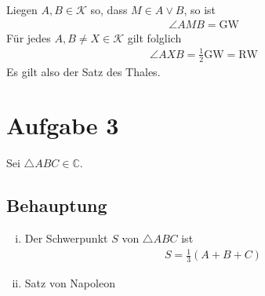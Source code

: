 \documentclass[11pt]{article}
\begin{document}
	\noindent Liegen $ A,B \in \mathcal{K} $ so, dass $ M \in A \lor B $, so ist
	\begin{align*}
	\angle AMB = \mathrm{GW}
	\end{align*}
	Für jedes $ A,B \neq X \in \mathcal{K} $ gilt folglich
	\begin{align*}
	\angle AXB = \frac{1}{2} \mathrm{GW} = \mathrm{RW}
	\end{align*}
	Es gilt also der Satz des Thales. 
	\newpage
\section*{Aufgabe 3}
Sei $ \triangle ABC \in \mathbb{C} $.
\subsection*{Behauptung}
\begin{enumerate}[i)]
	\item Der Schwerpunkt $ S $ von $ \triangle ABC $ ist
	\begin{equation*}
	\begin{aligned}
	S = \frac{1}{3} \left(A + B + C\right)
	\end{aligned}
	\end{equation*}
	\item Satz von Napoleon
\end{enumerate}
\end{document}

